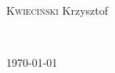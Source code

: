 \begin{titlepage}
\begin{minipage}{0.4\textwidth}
\begin{flushleft} \large
\textsc{Kwieciński} Krzysztof \\
\end{flushleft}
\end{minipage}
~
\begin{minipage}{0.4\textwidth}
\begin{flushright} \large
\end{flushright}
\end{minipage}%

\vfill



{\large \today}%





\end{titlepage}
